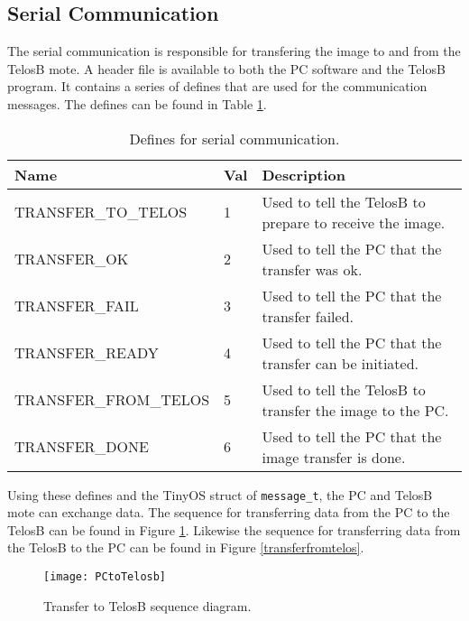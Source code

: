 \subsection{Serial Communication}
\label{sec:Serial-Communication}
The serial communication is responsible for transfering the image to and from the TelosB mote. A header file is available to both the PC software and the TelosB program. It contains a series of defines that are used for the communication messages. The defines can be found in Table \ref{definetable}.
\begin{table}[H]
\centering
    \begin{tabular}{lll}
    \hline
    Name                  & Val & Description                                               \\ \hline
    \rowcolor{gr}
    TRANSFER\_TO\_TELOS   & 1     & Used to tell the TelosB to prepare to receive the image. \\ %
    TRANSFER\_OK          & 2     & Used to tell the PC that the transfer was ok.             \\ %
    \rowcolor{gr}
    TRANSFER\_FAIL        & 3     & Used to tell the PC that the transfer failed.             \\ %
    TRANSFER\_READY       & 4     & Used to tell the PC that the transfer can be initiated.   \\ %
    \rowcolor{gr}
    TRANSFER\_FROM\_TELOS & 5     & Used to tell the TelosB to transfer the image to the PC.  \\ %
    TRANSFER\_DONE        & 6     & Used to tell the PC that the image transfer is done.      \\ \hline
    \end{tabular}
    \caption{Defines for serial communication.}
    \label{definetable}
\end{table}

Using these defines and the TinyOS struct of \texttt{message\_t}, the PC and TelosB mote can exchange data. 
The sequence for transferring data from the PC to the TelosB can be found in Figure \ref{transfertotelos}. 
Likewise the sequence for transferring data from the TelosB to the PC can be found in Figure \ref{transferfromtelos}.

\begin{figure}[H]
	\centering
	\texttt{[image: PCtoTelosb]}
	\caption{Transfer to TelosB sequence diagram.}
	\label{transfertotelos}
\end{figure}

